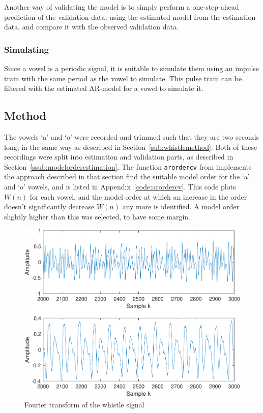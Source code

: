 \documentclass{IEEEtran}
\newcommand{\code}[1]{\texttt{#1}}
\begin{document}
Another way of validating the model is to simply perform a one-step-ahead
prediction of the validation data, using the estimated model from the
estimation data, and compare it with the observed validation data.

\subsubsection{Simulating}
Since a vowel is a periodic signal, it is suitable to simulate them using an
impulse train with the same period as the vowel to simulate. This pulse train
can be filtered with the estimated AR-model for a vowel to simulate it.

\subsection{Method}
The vowels `a' and `o' were recorded and trimmed such that they are two seconds
long, in the same way as described in Section~\ref{sub:whistlemethod}.
Both of these recordings were split into estimation and validation parts,
as described in Section~\ref{ssub:modelorderestimation}. The function
\code{arordercv} from \cite{signalproc} implements the approach described in
that section find the suitable model order for the `a' and `o' vowels, and is
listed in Appendix~\ref{code:arordercv}. This code plots $W(n)$ for each
vowel, and the model order at which an increase in the order doesn't
significantly decrease $W(n)$ any more is identified. A model order slightly
higher than this was selected, to have some margin.

\begin{figure}[h]
  \centering
  \captionsetup{justification=centering}

  \includegraphics[width=0.8\columnwidth]{pictures/raw_o_audio.pdf}
  \caption{Fourier transform of the whistle signal}
  \label{fig:rawaaudio}

\end{figure}
\end{document}

